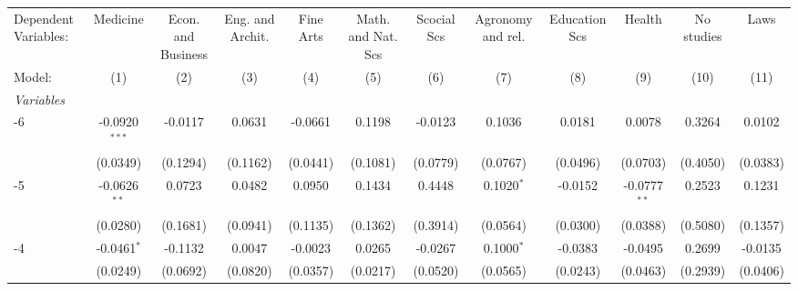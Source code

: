 \begingroup
\centering
\begin{adjustbox}{width=650}  
\begin{tabular}{lccccccccccc}
   \tabularnewline \midrule \midrule
   Dependent Variables:                     & Medicine               & Econ. and Business & Eng. and Archit. & Fine Arts      & Math. and Nat. Scs & Scocial Scs & Agronomy and rel. & Education Scs      & Health  & No studies              & Laws\\  
   Model:                                   & (1)             & (2)                  & (3)                        & (4)           & (5)                           & (6)                         & (7)                   & (8)              & (9)            & (10)      & (11)\\  
   \midrule
   \emph{Variables}\\
    -6    & -0.0920$^{***}$ & -0.0117              & 0.0631                     & -0.0661       & 0.1198                        & -0.0123                     & 0.1036                & 0.0181           & 0.0078         & 0.3264    & 0.0102\\   
                                            & (0.0349)        & (0.1294)             & (0.1162)                   & (0.0441)      & (0.1081)                      & (0.0779)                    & (0.0767)              & (0.0496)         & (0.0703)       & (0.4050)  & (0.0383)\\   
    -5    & -0.0626$^{**}$  & 0.0723               & 0.0482                     & 0.0950        & 0.1434                        & 0.4448                      & 0.1020$^{*}$          & -0.0152          & -0.0777$^{**}$ & 0.2523    & 0.1231\\   
                                            & (0.0280)        & (0.1681)             & (0.0941)                   & (0.1135)      & (0.1362)                      & (0.3914)                    & (0.0564)              & (0.0300)         & (0.0388)       & (0.5080)  & (0.1357)\\   
    -4    & -0.0461$^{*}$   & -0.1132              & 0.0047                     & -0.0023       & 0.0265                        & -0.0267                     & 0.1000$^{*}$          & -0.0383          & -0.0495        & 0.2699    & -0.0135\\   
                                            & (0.0249)        & (0.0692)             & (0.0820)                   & (0.0357)      & (0.0217)                      & (0.0520)                    & (0.0565)              & (0.0243)         & (0.0463)       & (0.2939)  & (0.0406)\\   

\end{tabular}
\end{adjustbox}
